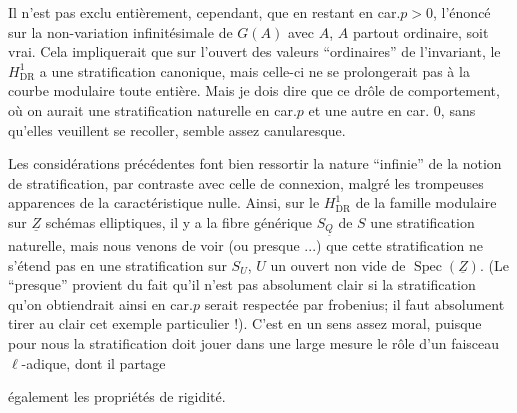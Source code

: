 Il n'est pas exclu entièrement, cependant, que en restant en car.$p>0$, l'énoncé sur la non-variation  infinitésimale de $G(A)$ avec $A$, $A$ partout ordinaire, soit vrai. Cela impliquerait que sur l'ouvert des valeurs ``ordinaires'' de l'invariant, le $H^1_{\operatorname{DR}}$ a une stratification canonique, mais celle-ci ne se prolongerait pas à la courbe modulaire toute entière. Mais je dois dire que ce drôle de comportement, où on aurait une stratification naturelle en car.$p$ et une autre en car. 0, sans qu'elles veuillent se recoller, semble assez canularesque.

\inserted{[}Les considérations précédentes font bien ressortir la nature ``infinie'' de la notion de stratification, par contraste avec celle de connexion, malgré les trompeuses apparences de la caractéristique nulle. Ainsi, sur le $H^1_{\operatorname{DR}}$ de la famille modulaire sur $\underline{Z}$   schémas elliptiques, il y a   la fibre générique $S_{\underline{Q}}$ de $S$ une stratification naturelle, mais nous venons de voir (ou presque ...) que cette stratification ne s'étend pas en une stratification sur $S_U$, $U$ un ouvert non vide de $\operatorname{Spec}(\underline{Z})$. (Le ``presque'' provient du fait qu'il n'est pas absolument clair si la stratification qu'on obtiendrait ainsi en car.$p$ serait respectée par frobenius; il faut absolument tirer au clair cet exemple particulier !). C'est en un sens assez moral, puisque pour nous la  stratification doit jouer dans une large mesure le rôle d'un faisceau $\ell$-adique, dont il partage


également les propriétés de rigidité.\inserted{]}

